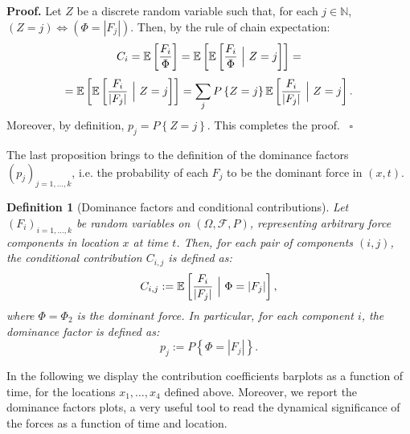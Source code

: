 \documentclass{article}
\newtheorem{definition}[theorem]{Definition}
\newenvironment{proof}[1][Proof]{\noindent\textbf{#1.} }{\ $\square$}
\begin{document}
\begin{proof}
Let $Z$ be a discrete random variable such that, for each $j\in\mathbb N$, $(Z=j) \Longleftrightarrow (\Phi=|F_j|)$. Then, by the rule of chain expectation:
$$C_i=\mathbb E\left[\frac{F_i}{\Phi}\right]=\mathbb E\left[\mathbb E\left[\frac{F_i}{\Phi}\ \Big{|}\ Z=j\right]\right]=$$
$$=\mathbb E\left[\mathbb E\left[\frac{F_i}{|F_j|}\ \Big{|}\ Z=j\right]\right]=\sum_j P\left\{Z=j\right\} \mathbb E\left[\frac{F_i}{|F_j|}\ \Big{|}\ Z=j\right].$$
Moreover, by definition, $p_j=P\left\{Z=j\right\}$. This completes the proof.
\end{proof}

The last proposition brings to the definition of the dominance factors $(p_j)_{j=1,\dots, k}$, i.e. the probability of each $F_j$ to be the dominant force in $(x,t)$.

\begin{definition}[Dominance factors and conditional contributions]
Let $(F_i)_{i=1,\dots, k}$ be random variables on $(\Omega, \mathcal F, P)$, representing arbitrary force components in location $x$ at time $t$. Then, for each pair of components $(i,j)$, the conditional contribution $C_{i,j}$ is defined as:
$$C_{i,j}:=\mathbb E\left[\frac{F_i}{|F_j|}\ \Big{|}\ \Phi=|F_j|\right],$$
where $\Phi=\Phi_2$ is the dominant force. In particular, for each component $i$, the dominance factor is defined as:
$$p_j:=P\left\{\Phi=|F_j|\right\}.$$
\end{definition}

In the following we display the contribution coefficients barplots as a function of time, for the locations $x_1,\dots,x_4$ defined above. Moreover, we report the dominance factors plots, a very useful tool to read the dynamical significance of the forces as a function of time and location.
\end{document}
